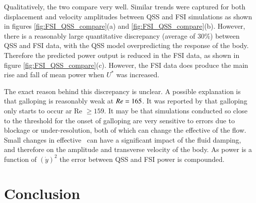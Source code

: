 Qualitatively, the two compare very well. Similar trends were captured for both displacement and velocity amplitudes between QSS and FSI simulations as shown in figures \ref{fig:FSI_QSS_compare}(a) and \ref{fig:FSI_QSS_compare}(b). However, there is a reasonably large quantitative discrepancy (average of $30\%$) between QSS and FSI data, with the QSS model overpredicting the response of the body. Therefore the predicted power output is reduced in the FSI data, as shown in figure \ref{fig:FSI_QSS_compare}(c). However, the FSI data does produce the main rise and fall of mean power when $U^*$ was increased.

The exact reason behind this discrepancy is unclear. A possible explanation is that galloping is reasonably weak at $Re=165$.  It was reported by \cite{Barrero-Gil2009} that galloping only starts to occur ar Re $\geq 159$. It may be that simulations conducted so close to the threshold for the onset of galloping are very sensitive to errors due to blockage or under-resolution, both of which can change the effective \reynoldsnumber of the flow. Small changes in effective \reynoldsnumber\ can have a significant impact of the fluid damping, and therefore on the amplitude and transverse velocity of the body. As power is a function of $(\dot{y})^2$ the error between QSS and FSI power is compounded.

\section{Conclusion}
\label{sec:conc}


